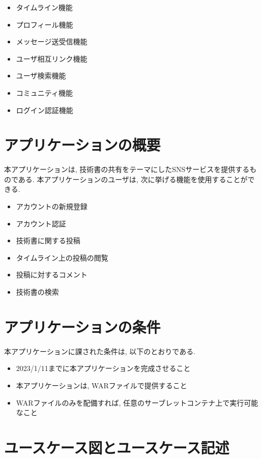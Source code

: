 \documentclass[dvipdfmx]{jsarticle}
\begin{document}
    \begin{itemize}
        \item タイムライン機能
        \item プロフィール機能
        \item メッセージ送受信機能
        \item ユーザ相互リンク機能
        \item ユーザ検索機能
        \item コミュニティ機能
        \item ログイン認証機能
    \end{itemize}

    \section{アプリケーションの概要}
    本アプリケーションは, 技術書の共有をテーマにしたSNSサービスを提供するものである. 本アプリケーションのユーザは, 次に挙げる機能を使用することができる.

    \begin{itemize}
        \item アカウントの新規登録
        \item アカウント認証
        \item 技術書に関する投稿
        \item タイムライン上の投稿の閲覧
        \item 投稿に対するコメント
        \item 技術書の検索
    \end{itemize}

    \section{アプリケーションの条件}
    本アプリケーションに課された条件は, 以下のとおりである.
    \begin{itemize}
        \item 2023/1/11までに本アプリケーションを完成させること
        \item 本アプリケーションは, WARファイルで提供すること
        \item WARファイルのみを配備すれば, 任意のサーブレットコンテナ上で実行可能なこと
    \end{itemize}
    \newpage

    \section*{ユースケース図とユースケース記述}
\end{document}
